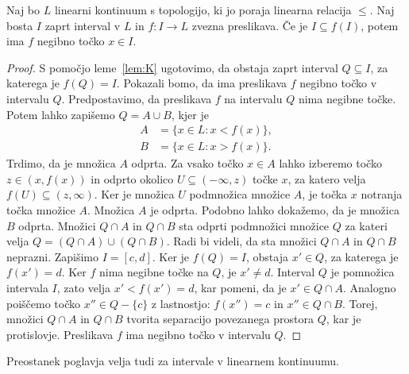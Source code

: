 \documentclass[../TG_magistrsko_delo_sections.tex]{subfiles}
\begin{document}
\begin{lema}
Naj bo $L$ linearni kontinuum s topologijo, ki jo poraja linearna relacija $\leq$. Naj bosta $I$ zaprt interval v $L$ in $f \colon I \to L$ zvezna preslikava. Če je $I \subseteq f(I)$, potem ima $f$ negibno točko $x \in I$.
\end{lema}
\begin{proof}
S pomočjo leme~\ref{lem:K} ugotovimo, da obstaja zaprt interval $Q \subseteq I$, za katerega je $f(Q) = I$. Pokazali bomo, da ima preslikava $f$ negibno točko v intervalu $Q$. Predpostavimo, da preslikava $f$ na intervalu $Q$ nima negibne točke. Potem lahko zapišemo $Q = A \cup B$, kjer je
\begin{equation*} %
\begin{split}
A &= \{x \in L : x < f(x)\}, \\ 
B &= \{x \in L : x > f(x)\}.
\end{split}
\end{equation*}
Trdimo, da je množica $A$ odprta. Za vsako točko $x \in A$ lahko izberemo točko $z \in (x, f(x))$ in odprto okolico $U \subseteq  (-\infty, z)$ točke $x$, za katero velja $f(U) \subseteq (z, \infty)$. Ker je množica $U$ podmnožica množice $A$, je točka $x$ notranja točka množice $A$. Množica $A$ je odprta. Podobno lahko dokažemo, da je množica $B$ odprta. Množici $Q \cap A$ in $Q \cap B$ sta odprti podmnožici množice $Q$ za kateri velja $Q = (Q \cap A) \cup (Q \cap B)$. Radi bi videli, da sta množici $Q \cap A$ in $Q \cap B$ neprazni. Zapišimo $I = [c, d]$. Ker je $f(Q) = I$, obstaja $x' \in Q$, za katerega je $f(x') =d$. Ker $f$ nima negibne točke na $Q$, je $x' \neq d$. Interval $Q$ je pomnožica intervala $I$, zato velja $x' < f(x') = d$, kar pomeni, da je $x' \in Q \cap A$. Analogno poiščemo točko $x'' \in Q - \{c\}$ z lastnostjo: $f(x'') = c$ in $x'' \in Q \cap B$. Torej, množici $Q \cap A$ in $Q \cap B$ tvorita separacijo povezanega prostora $Q$, kar je protislovje. Preslikava $f$ ima negibno točko v intervalu $Q$.
\end{proof}

Preostanek poglavja velja tudi za intervale v linearnem kontinuumu.
\end{document}
